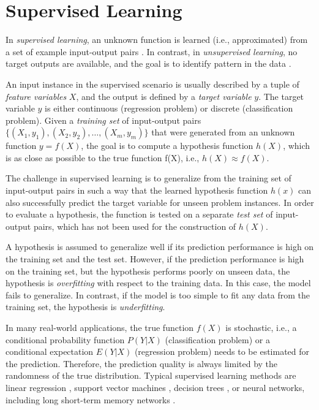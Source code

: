\section{Supervised Learning}

In \textit{supervised learning}, an unknown function is learned (i.e., approximated) from a set of example input-output pairs \cite{DBLP:books/daglib/0023820}.
In contrast, in \textit{unsupervised learning}, no target outputs are available, and the goal is to identify pattern in the data \cite{DBLP:conf/ac/Ghahramani03}.

An input instance in the supervised scenario is usually described by a tuple of \textit{feature variables} $X$, and the output is defined by a \textit{target variable} $y$.
The target variable $y$ is either continuous (regression problem) or discrete (classification problem).
Given a \textit{training set} of input-output pairs $\{(X_1, y_1), (X_2, y_2), \dots, (X_m,y_m)\}$ that were generated from an unknown function $y = f(X)$, the goal is to compute a hypothesis function $h(X)$, which is as close as possible to the true function f(X), i.e., $h(X) \approx f(X)$.

The challenge in supervised learning is to generalize from the training set of input-output pairs in such a way that the learned hypothesis function $h(x)$ can also successfully predict the target variable for unseen problem instances.
In order to evaluate a hypothesis, the function is tested on a separate \textit{test set} of input-output pairs, which has not been used for the construction of $h(X)$.

A hypothesis is assumed to generalize well if its prediction performance is high on the training set and the test set.
However, if the prediction performance is high on the training set, but the hypothesis performs poorly on unseen data, the hypothesis is \textit{overfitting} with respect to the training data.
In this case, the model fails to generalize.
In contrast, if the model is too simple to fit any data from the training set, the hypothesis is \textit{underfitting}.

In many real-world applications, the true function $f(X)$ is stochastic, i.e., a conditional probability function $P(Y | X)$ (classification problem) or a conditional expectation $E(Y | X)$ (regression problem) needs to be estimated for the prediction.
Therefore, the prediction quality is always limited by the randomness of the true distribution.
Typical supervised learning methods are linear regression \cite{galton1886regression}, support vector machines \cite{DBLP:journals/ml/CortesV95}, decision trees \cite{DBLP:journals/ml/Quinlan86}, or neural networks, including long short-term memory networks \cite{DBLP:journals/neco/HochreiterS97}.

